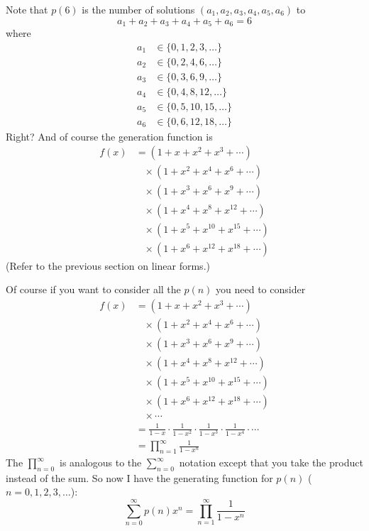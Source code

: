 \newpage
Note that $p(6)$ is the number of solutions $(a_1, a_2, a_3, a_4, a_5, a_6)$ to
\[
a_1 +  a_2 +  a_3 + a_4 + a_5 + a_6 = 6
\]
where 
\begin{align*}
a_1 &\in \{0, 1, 2, 3, \ldots\} \\
a_2 &\in \{0, 2, 4, 6, \ldots\} \\
a_3 &\in \{0, 3, 6, 9, \ldots\} \\
a_4 &\in \{0, 4, 8, 12, \ldots\} \\
a_5 &\in \{0, 5, 10, 15, \ldots\} \\
a_6 &\in \{0, 6, 12, 18, \ldots\} 
\end{align*}
Right? 
And of course the generation function is
\begin{align*}
f(x) 
&= (1 + x + x^2 + x^3 + \cdots ) \\
& \,\,\,\,\, \times (1 + x^2 + x^4 + x^6 + \cdots ) \\
& \,\,\,\,\, \times (1 + x^3 + x^6 + x^9 + \cdots ) \\
& \,\,\,\,\, \times (1 + x^4 + x^8 + x^{12} + \cdots ) \\
& \,\,\,\,\, \times (1 + x^5 + x^{10} + x^{15} + \cdots ) \\
& \,\,\,\,\, \times (1 + x^6 + x^{12} + x^{18} + \cdots ) 
\end{align*}
(Refer to the previous section on linear forms.)

Of course if you want to consider all the $p(n)$ you need to consider
\begin{align*}
f(x) 
&= (1 + x + x^2 + x^3 + \cdots ) \\
& \,\,\,\,\, \times (1 + x^2 + x^4 + x^6 + \cdots ) \\
& \,\,\,\,\, \times (1 + x^3 + x^6 + x^9 + \cdots ) \\
& \,\,\,\,\, \times (1 + x^4 + x^8 + x^{12} + \cdots ) \\
& \,\,\,\,\, \times (1 + x^5 + x^{10} + x^{15} + \cdots ) \\
& \,\,\,\,\, \times (1 + x^6 + x^{12} + x^{18} + \cdots ) \\
& \,\,\,\,\, \times \cdots \\
&= \frac{1}{1 - x} \cdot \frac{1}{1 - x^2} \cdot \frac{1}{1 - x^3} \cdot \frac{1}{1 - x^4} \cdot \cdots \\
&= \prod_{n=1}^\infty \frac{1}{1 - x^n}
\end{align*}
The $\prod_{n=0}^\infty$ is analogous to the $\sum_{n=0}^\infty$ notation
except that you take the product instead of the sum.
So now I have the generating function for $p(n)$ ($n=0, 1, 2, 3, \ldots$):
\[
\sum_{n=0}^\infty p(n) x^n =  \prod_{n=1}^\infty \frac{1}{1 - x^n}
\]

